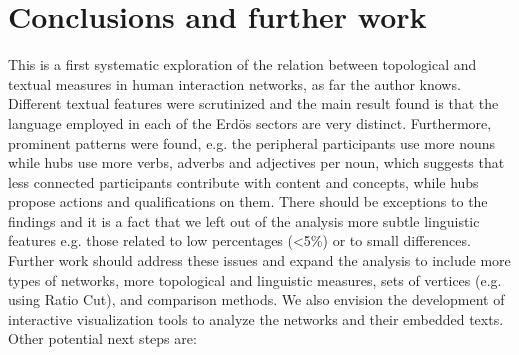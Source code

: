 \documentclass[review]{elsarticle}
\begin{document}
\section{Conclusions and further work}\label{scon}
This is a first systematic exploration of the relation between topological and textual
measures in human interaction networks, as far the author knows.
Different textual features were scrutinized and
the main result found is that the language employed in each of the Erdös sectors are very distinct.
Furthermore, prominent patterns were found,
e.g. the peripheral participants use more nouns while hubs use more verbs, adverbs and adjectives per noun,
which suggests that less connected participants contribute with content and concepts,
while hubs propose actions and qualifications on them.
There should be exceptions to the findings and it is a fact that we left out of the analysis
more subtle linguistic features e.g. those related to low percentages (<5\%) or to small
differences.
Further work should
address these issues and
expand the analysis to include
more types of networks, more topological and linguistic measures,
sets of vertices (e.g. using Ratio Cut),
and comparison methods.
We also envision the development of interactive visualization tools to analyze
the networks and their embedded texts.
Other potential next steps are:
\end{document}
